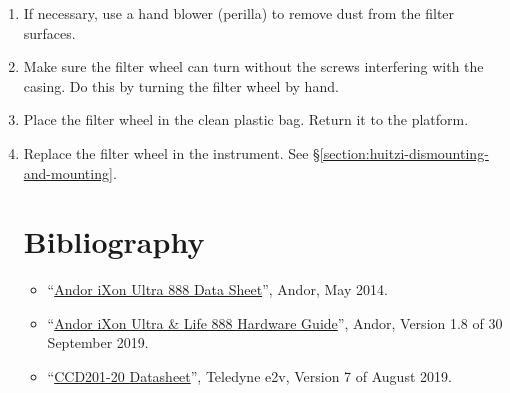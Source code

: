 \begin{enumerate}
    \item If necessary, use a hand blower (perilla) to remove dust from the filter surfaces.
    
    \item Make sure the filter wheel can turn without the screws interfering with the casing. Do this by turning the filter wheel by hand.
    
    \item Place the filter wheel in the clean plastic bag. Return it to the platform.
    
    \item Replace the filter wheel in the instrument. See \S\ref{section:huitzi-dismounting-and-mounting}.

\section{Bibliography}

\begin{flushleft}
\begin{itemize}
\item “\href{bibliography/huitzi/andor-ixon-ultra-888-data-sheet.pdf}{Andor iXon Ultra 888 Data Sheet}”, Andor, May 2014.
\item “\href{bibliography/huitzi/andor-ixon-ultra-888-hardware-guide.pdf}{Andor iXon Ultra \& Life 888 Hardware Guide}”, Andor, Version 1.8 of 30 September 2019.
\item “\href{bibliography/huitzi/e2v-ccd201-20-datasheet.pdf}{CCD201-20 Datasheet}”, Teledyne e2v, Version 7 of August 2019.
\end{itemize}
\end{flushleft}
    
\end{enumerate}